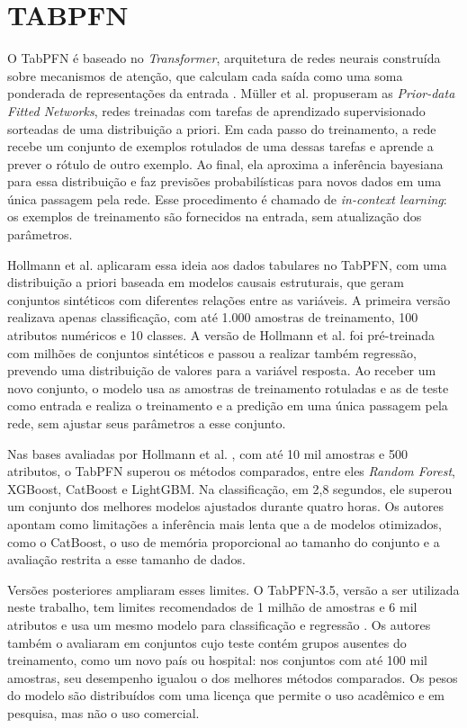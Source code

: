 \section{TABPFN}

O TabPFN é baseado no \textit{Transformer}, arquitetura de redes neurais construída sobre mecanismos de atenção, que calculam cada saída como uma soma ponderada de representações da entrada \cite{vaswani2017}. Müller et al. \cite{muller2022} propuseram as \textit{Prior-data Fitted Networks}, redes treinadas com tarefas de aprendizado supervisionado sorteadas de uma distribuição a priori. Em cada passo do treinamento, a rede recebe um conjunto de exemplos rotulados de uma dessas tarefas e aprende a prever o rótulo de outro exemplo. Ao final, ela aproxima a inferência bayesiana para essa distribuição e faz previsões probabilísticas para novos dados em uma única passagem pela rede. Esse procedimento é chamado de \textit{in-context learning}: os exemplos de treinamento são fornecidos na entrada, sem atualização dos parâmetros.

Hollmann et al. \cite{hollmann2023} aplicaram essa ideia aos dados tabulares no TabPFN, com uma distribuição a priori baseada em modelos causais estruturais, que geram conjuntos sintéticos com diferentes relações entre as variáveis. A primeira versão realizava apenas classificação, com até 1.000 amostras de treinamento, 100 atributos numéricos e 10 classes. A versão de Hollmann et al. \cite{hollmann2025} foi pré-treinada com milhões de conjuntos sintéticos e passou a realizar também regressão, prevendo uma distribuição de valores para a variável resposta. Ao receber um novo conjunto, o modelo usa as amostras de treinamento rotuladas e as de teste como entrada e realiza o treinamento e a predição em uma única passagem pela rede, sem ajustar seus parâmetros a esse conjunto.

Nas bases avaliadas por Hollmann et al. \cite{hollmann2025}, com até 10 mil amostras e 500 atributos, o TabPFN superou os métodos comparados, entre eles \textit{Random Forest}, XGBoost, CatBoost e LightGBM. Na classificação, em 2,8 segundos, ele superou um conjunto dos melhores modelos ajustados durante quatro horas. Os autores apontam como limitações a inferência mais lenta que a de modelos otimizados, como o CatBoost, o uso de memória proporcional ao tamanho do conjunto e a avaliação restrita a esse tamanho de dados.

Versões posteriores ampliaram esses limites. O TabPFN-3.5, versão a ser utilizada neste trabalho, tem limites recomendados de 1 milhão de amostras e 6 mil atributos e usa um mesmo modelo para classificação e regressão \cite{priorlabs2026}. Os autores também o avaliaram em conjuntos cujo teste contém grupos ausentes do treinamento, como um novo país ou hospital: nos conjuntos com até 100 mil amostras, seu desempenho igualou o dos melhores métodos comparados. Os pesos do modelo são distribuídos com uma licença que permite o uso acadêmico e em pesquisa, mas não o uso comercial.

